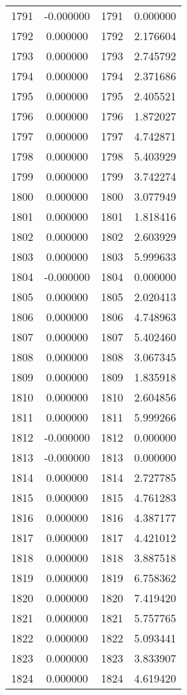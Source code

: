 \documentclass[12pt]{article}
\begin{document}
\begin{longtable}{@{}cccc@{}}
1791 & -0.000000 & 1791 & 0.000000 \\
1792 & 0.000000 & 1792 & 2.176604 \\
1793 & 0.000000 & 1793 & 2.745792 \\
1794 & 0.000000 & 1794 & 2.371686 \\
1795 & 0.000000 & 1795 & 2.405521 \\
1796 & 0.000000 & 1796 & 1.872027 \\
1797 & 0.000000 & 1797 & 4.742871 \\
1798 & 0.000000 & 1798 & 5.403929 \\
1799 & 0.000000 & 1799 & 3.742274 \\
1800 & 0.000000 & 1800 & 3.077949 \\
1801 & 0.000000 & 1801 & 1.818416 \\
1802 & 0.000000 & 1802 & 2.603929 \\
1803 & 0.000000 & 1803 & 5.999633 \\
1804 & -0.000000 & 1804 & 0.000000 \\
1805 & 0.000000 & 1805 & 2.020413 \\
1806 & 0.000000 & 1806 & 4.748963 \\
1807 & 0.000000 & 1807 & 5.402460 \\
1808 & 0.000000 & 1808 & 3.067345 \\
1809 & 0.000000 & 1809 & 1.835918 \\
1810 & 0.000000 & 1810 & 2.604856 \\
1811 & 0.000000 & 1811 & 5.999266 \\
1812 & -0.000000 & 1812 & 0.000000 \\
1813 & -0.000000 & 1813 & 0.000000 \\
1814 & 0.000000 & 1814 & 2.727785 \\
1815 & 0.000000 & 1815 & 4.761283 \\
1816 & 0.000000 & 1816 & 4.387177 \\
1817 & 0.000000 & 1817 & 4.421012 \\
1818 & 0.000000 & 1818 & 3.887518 \\
1819 & 0.000000 & 1819 & 6.758362 \\
1820 & 0.000000 & 1820 & 7.419420 \\
1821 & 0.000000 & 1821 & 5.757765 \\
1822 & 0.000000 & 1822 & 5.093441 \\
1823 & 0.000000 & 1823 & 3.833907 \\
1824 & 0.000000 & 1824 & 4.619420 \\

\end{longtable}
\end{document}
